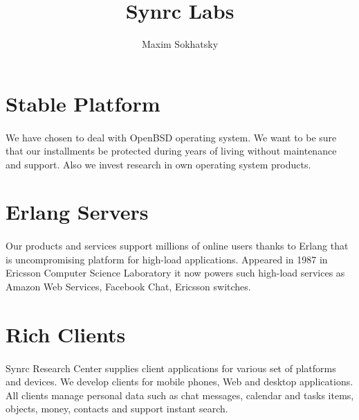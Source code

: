 \documentclass[11pt]{article}
\begin{document}

\title{Synrc Labs}
\author{Maxim Sokhatsky}


\section*{Stable Platform}
\paragraph{}
We have chosen to deal with OpenBSD operating system. We want to be sure that our
installments be protected during years of living without maintenance and support.
Also we invest research in own operating system products.


\section*{Erlang Servers}
\paragraph{}
Our products and services support millions of online users thanks to Erlang that
is uncompromising platform for high-load applications. Appeared in 1987 in Ericsson Computer
Science Laboratory it now powers such high-load services as Amazon Web Services, Facebook Chat, Ericsson switches.

\section*{Rich Clients}
\paragraph{}
Synrc Research Center supplies client applications for various set of platforms and devices.
We develop clients for mobile phones, Web and desktop applications. All clients manage personal data such as
chat messages, calendar and tasks items, objects, money, contacts and support instant search.
\end{document}
